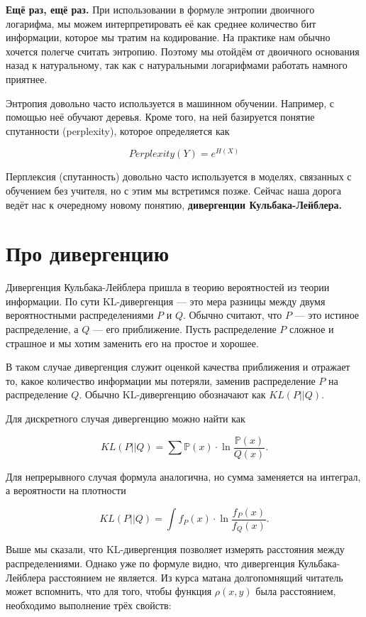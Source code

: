 \documentclass[12pt, a4paper, oneside]{extreport}
\def \mbb{\mathbb}
\def \PP{\mbb{P}}
\newcommand{\indef}[1]{\textbf{#1}}     %
\theoremstyle{plain}              %
\theoremstyle{definition}         %
\begin{document}

\textbf{Ещё раз, ещё раз.} При использовании в формуле энтропии двоичного логарифма, мы можем интерпретировать её как среднее количество бит информации, которое мы  тратим на кодирование. На практике нам обычно хочется полегче считать энтропию. Поэтому мы отойдём от двоичного основания назад к натуральному, так как с натуральными логарифмами работать намного приятнее. 

Энтропия довольно часто используется в машинном обучении. Например, с помощью неё обучают деревья.  Кроме того, на ней базируется понятие спутанности (perplexity), которое определяется как 

\[ Perplexity(Y) = e^{H(X)}\]

Перплексия (спутанность) довольно часто используется в моделях, связанных с обучением без учителя, но с этим мы встретимся позже. Сейчас наша дорога ведёт нас к очередному новому понятию, \indef{дивергенции Кульбака-Лейблера.}


\section{Про дивергенцию} 

Дивергенция Кульбака-Лейблера пришла в теорию вероятностей из теории информации. По сути KL-дивергенция --- это мера разницы между двумя вероятностными распределениями $P$ и $Q$.  Обычно считают, что $P$ --- это истиное распределение, а $Q$ --- его приближение.  Пусть распределение $P$ сложное и страшное и мы хотим заменить его на простое и хорошее. 



В таком случае дивергенция служит оценкой качества приближения и отражает то, какое количество информации мы потеряли, заменив распределение $P$ на распределение $Q$.  Обычно KL-дивергенцию обозначают как $KL(P || Q)$. 

Для дискретного случая дивергенцию можно найти как 

\[ KL(P || Q) = \sum  \PP(x) \cdot \ln \frac{ \PP(x)}{Q(x)}. \]

Для непрерывного случая формула аналогична, но сумма заменяется на интеграл, а вероятности на плотности


\[ KL(P || Q) = \int f_P(x) \cdot \ln \frac{ f_P(x)}{f_Q(x)}. \]

Выше мы сказали, что KL-дивергенция позволяет измерять расстояния между распределениями. Однако уже по формуле видно, что дивергенция Кульбака-Лейблера расстоянием не является.  Из курса матана долгопомнящий читатель может вспомнить, что для того, чтобы функция $\rho(x,y)$ была расстоянием, необходимо выполнение трёх свойств: 
\end{document}
